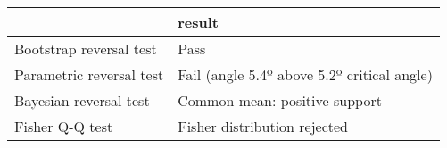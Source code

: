 \begin{tabular}{ll}
\toprule
{} &                                       result \\
\midrule
Bootstrap reversal test  &                                         Pass \\
Parametric reversal test &  Fail (angle 5.4º above 5.2º critical angle) \\
Bayesian reversal test   &                Common mean: positive support \\
Fisher Q-Q test          &                 Fisher distribution rejected \\
\bottomrule
\end{tabular}

